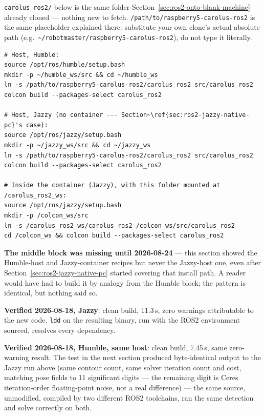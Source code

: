 \documentclass[11pt]{report}
\begin{document}
\texttt{carolus\_ros2/} below is the same folder Section~\ref{sec:ros2-onto-blank-machine}
already cloned --- nothing new to fetch. \texttt{/path/to/raspberry5-carolus-ros2}
is the same placeholder explained there: substitute your own clone's actual
absolute path (e.g.\ \texttt{\textasciitilde/robotmaster/raspberry5-carolus-ros2}), do not
type it literally.

\begin{lstlisting}[style=shell]
# Host, Humble:
source /opt/ros/humble/setup.bash
mkdir -p ~/humble_ws/src && cd ~/humble_ws
ln -s /path/to/raspberry5-carolus-ros2/carolus_ros2 src/carolus_ros2
colcon build --packages-select carolus_ros2

# Host, Jazzy (no container --- Section~\ref{sec:ros2-jazzy-native-pc}'s case):
source /opt/ros/jazzy/setup.bash
mkdir -p ~/jazzy_ws/src && cd ~/jazzy_ws
ln -s /path/to/raspberry5-carolus-ros2/carolus_ros2 src/carolus_ros2
colcon build --packages-select carolus_ros2

# Inside the container (Jazzy), with this folder mounted at /carolus_ros2_ws:
source /opt/ros/jazzy/setup.bash
mkdir -p /colcon_ws/src
ln -s /carolus_ros2_ws/carolus_ros2 /colcon_ws/src/carolus_ros2
cd /colcon_ws && colcon build --packages-select carolus_ros2
\end{lstlisting}

\textbf{The middle block was missing until 2026-08-24} --- this section
showed the Humble-host and Jazzy-container recipes but never the
Jazzy-host one, even after Section~\ref{sec:ros2-jazzy-native-pc} started
covering that install path. A reader would have had to build it by analogy
from the Humble block; the pattern is identical, but nothing said so.

\textbf{Verified 2026-08-18, Jazzy}: clean build, 11.3\,s, zero warnings
attributable to the new code. \texttt{ldd} on the resulting binary, run with
the ROS2 environment sourced, resolves every dependency.

\textbf{Verified 2026-08-18, Humble, same host}: clean build, 7.45\,s, same
zero-warning result. The test in the next section produced byte-identical
output to the Jazzy run above (same contour count, same solver iteration
count and cost, matching pose fields to 11 significant digits --- the
remaining digit is Ceres iteration-order floating-point noise, not a real
difference) --- the same source, unmodified, compiled by two different ROS2
toolchains, ran the same detection and solve correctly on both.
\end{document}
